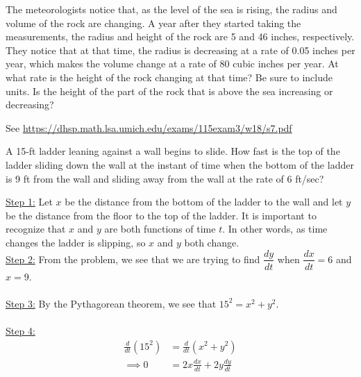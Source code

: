 \documentclass[11pt]{exam}
\begin{document}
\begin{questions}
\begin{center}
\end{center}
\vspace{-0.7em}
The meteorologists notice that, as the level of the sea is rising, the radius and volume of the rock are changing. A year after they started taking the measurements, the radius and height of the rock are 5 and 46 inches, respectively. They notice that at that time, the radius is decreasing at a rate of 0.05 inches per year, which makes the volume change at a rate of 80 cubic inches per year. At what rate is the height of the rock changing at that time? Be sure to include units. Is the height of the part of the rock that is above the sea increasing or decreasing?
\begin{solution}
  See \href{https://dhsp.math.lsa.umich.edu/exams/115exam3/w18/s7.pdf}{https://dhsp.math.lsa.umich.edu/exams/115exam3/w18/s7.pdf}
\end{solution}
\question A 15-ft ladder leaning against a wall begins to slide. How fast is the top of the ladder sliding down the wall at the instant of time when the bottom of the ladder is 9 ft from the wall and sliding away from the wall at the rate of 6 ft/sec?
\\
\begin{center}
\end{center}
\begin{solution}
  \underline{Step 1:} 
Let $x$ be the distance from the bottom of the ladder to the wall and let $y$ be the distance from the floor to the top of the ladder. It is important to recognize that $x$ and $y$ are both functions of time $t$. In other words, as time changes the ladder is slipping, so $x$ and $y$ both change. 
  \\
\underline{Step 2:} From the problem, we see that we are trying to find $\dfrac{dy}{dt}$ when $\dfrac{dx}{dt}=6$ and $x=9$. 
\\
\\\underline{Step 3:} By the Pythagorean theorem, we see that $15^2=x^2+y^2$. 
\\
\\\underline{Step 4:}
\begin{align*}
\frac{d}{dt}(15^2)&=\frac{d}{dt}(x^2+y^2)\\
\implies 0&= 2x\frac{dx}{dt}+2y\frac{dy}{dt}

\end{align*}
\end{solution}
\end{questions}
\end{document}
